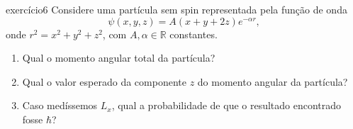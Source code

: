 \begin{exercício}{}{exercício6}
    Considere uma partícula sem spin representada pela função de onda
    \begin{equation*}
        \psi(x,y,z) = A(x + y + 2z) e^{-\alpha r},
    \end{equation*}
    onde \(r^2 = x^2 + y^2 + z^2\), com \(A, \alpha \in \mathbb{R}\) constantes.
    \begin{enumerate}[label=(\alph*)]
        \item Qual o momento angular total da partícula?
        \item Qual o valor esperado da componente \(z\) do momento angular da partícula?
        \item Caso medíssemos \(L_x\), qual a probabilidade de que o resultado encontrado fosse \(\hbar\)?
    \end{enumerate}
\end{exercício}
